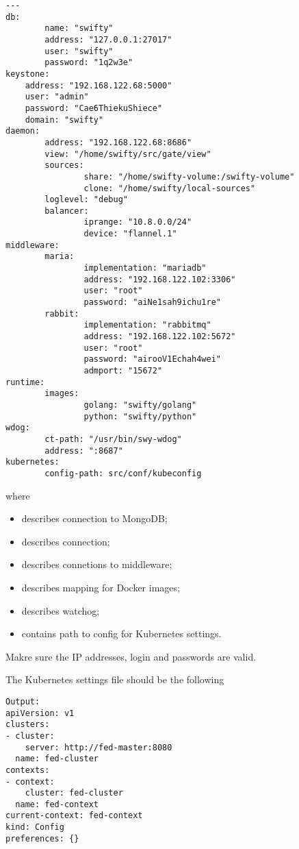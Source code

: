 \begin{lstlisting}
---
db:
        name: "swifty"
        address: "127.0.0.1:27017"
        user: "swifty"
        password: "1q2w3e"
keystone:
	address: "192.168.122.68:5000"
	user: "admin"
	password: "Cae6ThiekuShiece"
	domain: "swifty"
daemon:
        address: "192.168.122.68:8686"
        view: "/home/swifty/src/gate/view"
        sources:
                share: "/home/swifty-volume:/swifty-volume"
                clone: "/home/swifty/local-sources"
        loglevel: "debug"
        balancer:
                iprange: "10.8.0.0/24"
                device: "flannel.1"
middleware:
        maria:
                implementation: "mariadb"
                address: "192.168.122.102:3306"
                user: "root"
                password: "aiNe1sah9ichu1re"
        rabbit:
                implementation: "rabbitmq"
                address: "192.168.122.102:5672"
                user: "root"
                password: "airooV1Echah4wei"
                admport: "15672"
runtime:
        images:
                golang: "swifty/golang"
                python: "swifty/python"
wdog:
        ct-path: "/usr/bin/swy-wdog"
        address: ":8687"
kubernetes:
        config-path: src/conf/kubeconfig
\end{lstlisting}

where
\begin{itemize}
\item{ describes connection to MongoDB;}
\item{ describes  connection;}
\item{ describes connetions to middleware;}
\item{ describes mapping for Docker images;}
\item{ describes  watchog;}
\item{ contains path to config for Kubernetes settings.}
\end{itemize}

Makre sure the IP addresses, login and passwords are valid.

The Kubernetes settings file should be the following

\begin{lstlisting}
Output:
apiVersion: v1
clusters:
- cluster:
    server: http://fed-master:8080
  name: fed-cluster
contexts:
- context:
    cluster: fed-cluster
  name: fed-context
current-context: fed-context
kind: Config
preferences: {}
\end{lstlisting}

